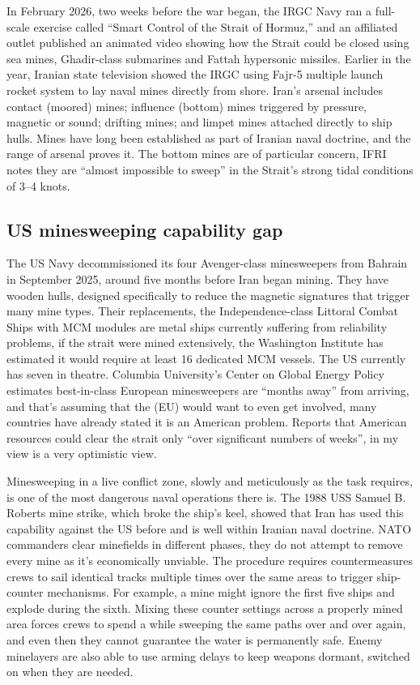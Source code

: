 \documentclass[12pt,a4paper]{article}
\begin{document}
In February 2026, two weeks before the war began, the IRGC Navy ran a full-scale exercise called “Smart Control of the Strait of Hormuz,” and an affiliated outlet published an animated video showing how the Strait could be closed using sea mines, Ghadir-class submarines and Fattah hypersonic missiles. Earlier in the year, Iranian state television showed the IRGC using Fajr-5 multiple launch rocket system to lay naval mines directly from shore. Iran’s arsenal includes contact (moored) mines; influence (bottom) mines triggered by pressure, magnetic or sound; drifting mines; and limpet mines attached directly to ship hulls. Mines have long been established as part of Iranian naval doctrine, and the range of arsenal proves it. The bottom mines are of particular concern, IFRI notes they are “almost impossible to sweep” in the Strait’s strong tidal conditions of 3–4 knots.

\subsection{US minesweeping capability gap}
The US Navy decommissioned its four Avenger-class minesweepers from Bahrain in September 2025, around five months before Iran began mining. They have wooden hulls, designed specifically to reduce the magnetic signatures that trigger many mine types. Their replacements, the Independence-class Littoral Combat Ships with MCM modules are metal ships currently suffering from reliability problems, if the strait were mined extensively, the Washington Institute has estimated it would require at least 16 dedicated MCM vessels. The US currently has seven in theatre.
Columbia University’s Center on Global Energy Policy estimates best-in-class European minesweepers are “months away” from arriving, and that's assuming that the (EU) would want to even get involved, many countries have already stated it is an American problem. Reports that American resources could clear the strait only “over significant numbers of weeks”, in my view is a very optimistic view. 

Minesweeping in a live conflict zone, slowly and meticulously as the task requires, is one of the most dangerous naval operations there is. The 1988 USS Samuel B. Roberts mine strike, which broke the ship’s keel, showed that Iran has used this capability against the US before and is well within Iranian naval doctrine. NATO commanders clear minefields in different phases, they do not attempt to remove every mine as it's economically unviable. The procedure requires countermeasures crews to sail identical tracks multiple times over the same areas to trigger ship-counter mechanisms. For example, a mine might ignore the first five ships and explode during the sixth. Mixing these counter settings across a properly mined area forces crews to spend a while sweeping the same paths over and over again, and even then they cannot guarantee the water is permanently safe. Enemy minelayers are also able to use arming delays to keep weapons dormant, switched on when they are needed. 
\end{document}
